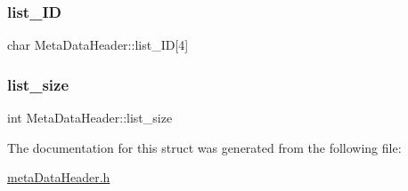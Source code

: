 \subsubsection{\texorpdfstring{list\+\_\+\+ID}{list\_ID}}
{\footnotesize\ttfamily char Meta\+Data\+Header\+::list\+\_\+\+ID\mbox{[}4\mbox{]}}

\mbox{\label{structMetaDataHeader_aa235aaa4faacbabeefff7826c26138aa}} 
\subsubsection{\texorpdfstring{list\+\_\+size}{list\_size}}
{\footnotesize\ttfamily int Meta\+Data\+Header\+::list\+\_\+size}



The documentation for this struct was generated from the following file\+:\begin{DoxyCompactItemize}
\item 
\hyperlink{metaDataHeader_8h}{meta\+Data\+Header.\+h}\end{DoxyCompactItemize}
